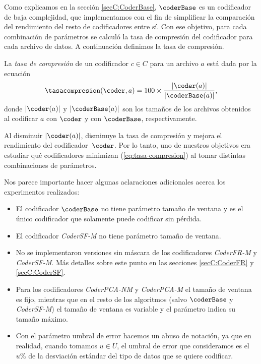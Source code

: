 \newcommand{\cbits}{\coder_{\textit{S}}}
\newcommand{\basebits}{\textit{Base}_{\textit{S}}}
Como explicamos en la sección \ref{secC:CoderBase}, $\coderBase$ es un codificador de baja complejidad, que implementamos con el fin de simplificar la comparación del rendimiento del resto de codificadores entre sí. Con ese objetivo, para cada combinación de parámetros se calculó la tasa de compresión del codificador para cada archivo de datos. A continuación definimos la tasa de compresión.

\begin{defcion}
La \textit{tasa de compresión} de un codificador $c \in C$ para un archivo $a$ está dada por la ecuación
\vspace{-5pt}
\begin{equation}
\label{eq:tasa-compresion}
\tasacompresion(\coder, a) = 100\times\frac{|\coder(a)|}{|\coderBase(a)|},
\end{equation}
donde $|\coder(a)|$ y $|\coderBase(a)|$ son los tamaños de los archivos obtenidos al codificar $a$ con $\coder$ y con $\coderBase$, respectivamente.
\end{defcion}

Al disminuir $|\coder(a)|$, disminuye la tasa de compresión y mejora el rendimiento del codificador~$\coder$. Por lo tanto, uno de nuestros objetivos era estudiar qué codificadores minimizan (\ref{eq:tasa-compresion}) al tomar distintas combinaciones de parámetros.

\vspace{+5pt}
Nos parece importante hacer algunas aclaraciones adicionales acerca los experimentos realizados:

\vspace{-8pt}
\begin{itemize}
    \item El codificador $\coderBase$ no tiene parámetro tamaño de ventana y es el único codificador que solamente puede codificar sin pérdida.
    \item El codificador \textit{CoderSF-M} no tiene parámetro tamaño de ventana.
    \item No se implementaron versiones sin máscara de los codificadores \textit{CoderFR-M} y \textit{CoderSF-M}. Más detalles sobre este punto en las secciones \ref{secC:CoderFR} y \ref{secC:CoderSF}.
    \item Para los codificadores \textit{CoderPCA-NM} y \textit{CoderPCA-M} el tamaño de ventana es fijo, mientras que en el resto de los algoritmos (salvo $\coderBase$ y \textit{CoderSF-M}) el tamaño de ventana es variable y el parámetro indica su tamaño máximo.
    \item Con el parámetro umbral de error hacemos un abuso de notación, ya que en realidad, cuando tomamos $u \in U$, el umbral de error que consideramos es el $u\%$ de la desviación estándar del tipo de datos que se quiere codificar.
\end{itemize}

